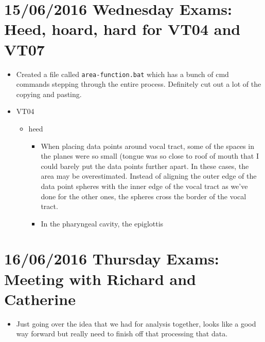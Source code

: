 \documentclass{article}
\begin{document}
\section*{15/06/2016 Wednesday Exams: Heed, hoard, hard for VT04 and VT07}
\begin{itemize}
    \item Created a file called \verb|area-function.bat| which has a bunch of cmd commands stepping through the entire process. Definitely cut out a lot of the copying and pasting.

    \item VT04
    \begin{itemize}
    
        \item heed
        \begin{itemize}
            \item When placing data points around vocal tract, some of the spaces in the planes were so small (tongue was so close to roof of mouth that I could barely put the data points further apart. In these cases, the area may be overestimated. Instead of aligning the outer edge of the data point spheres with the inner edge of the vocal tract as we've done for the other ones, the spheres cross the border of the vocal tract.
            \item In the pharyngeal cavity, the epiglottis
        \end{itemize}
        
    \end{itemize}
\end{itemize}

\section*{16/06/2016 Thursday Exams: Meeting with Richard and Catherine}
\begin{itemize}
    \item Just going over the idea that we had for analysis together, looks like a good way forward but really need to finish off that processing that data.    
\end{itemize}
\end{document}
